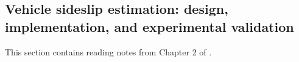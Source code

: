 \subsection{Vehicle sideslip estimation: design, implementation, and experimental validation}

This section contains reading notes from Chapter 2 of \cite{grip}.








